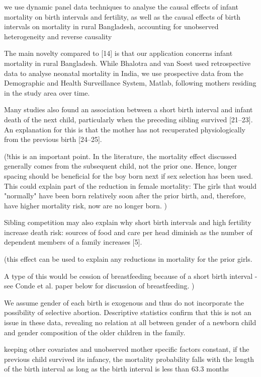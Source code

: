 \citet{Soest2018}

we use dynamic panel data techniques to analyse the causal effects of
infant mortality on birth intervals and fertility, as well as the causal
effects of birth intervals on mortality in rural Bangladesh, accounting
for unobserved heterogeneity and reverse causality


The main novelty compared to [14] is that our application concerns
infant mortality in rural Bangladesh. While Bhalotra and van Soest used
retrospective data to analyse neonatal mortality in India, we use
prospective data from the Demographic and Health Surveillance System,
Matlab, following mothers residing in the study area over time.


Many studies also found an association between a short birth interval
and infant death of the next child, particularly when the preceding
sibling survived [21–23]. An explanation for this is that the mother has
not recuperated physiologically from the previous birth [24–25].

(!this is an important point. In the literature, the mortality effect
discussed
generally comes from the subsequent child, not the prior one. 
Hence, longer spacing should be beneficial for the boy born next if 
sex selection has been used.
This could explain part of the reduction in female mortality: The
girls that would "normally" have been born relatively soon after the
prior birth, and, therefore, have higher mortality risk, now are no
longer born.
)

Sibling competition may also explain why short birth intervals and high
fertility increase death risk: sources of food and care per head
diminish as the number of dependent members of a family increases [5].

(this effect can be used to explain any reductions in mortality for
the prior girls.

A type of this would be cession of breastfeeding because of a short
birth interval - see Conde et al. paper below for discussion of 
breastfeeding. 
)

We assume gender of each birth is exogenous and thus do not incorporate
the possibility of selective abortion. Descriptive statistics confirm
that this is not an issue in these data, revealing no relation at all
between gender of a newborn child and gender composition of the older
children in the family.


keeping other covariates and unobserved mother specific factors
constant, if the previous child survived its infancy, the mortality
probability falls with the length of the birth interval as long as the
birth interval is less than 63.3 months

